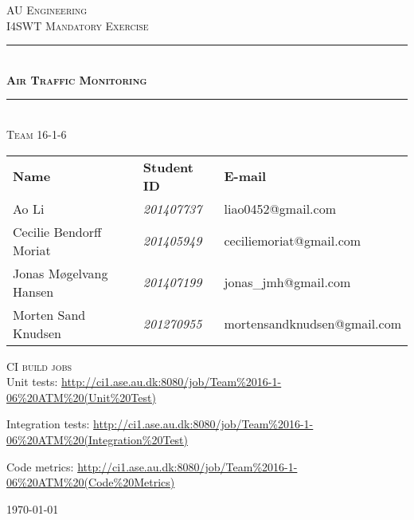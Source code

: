 \newcommand{\HRule}{\rule{\linewidth}{0.1mm}} %
\pagestyle{empty}
\begin{center}
	\vspace{3cm}
	\textsc{\LARGE AU Engineering}\\[1.5cm] %
	
	\textsc{\large I4SWT Mandatory Exercise}\\[2.5cm] 
	\HRule \\[0.8cm]
	{\huge \bfseries \textsc{Air Traffic Monitoring}} \\[0.5cm]{\LARGE }
	\HRule \\[1.5cm]
	
	\textsc{\Large Team 16-1-6}\\
	\vspace{0.5 in}
	\begin{center}
		\begin{tabular}{l l l}
			\textbf{Name} & \textbf{Student ID} & \textbf{E-mail} \\
			Ao Li & \textsl{201407737} &  liao0452@gmail.com  \\
			Cecilie Bendorff Moriat & \textsl{201405949} & ceciliemoriat@gmail.com \\
			Jonas Møgelvang Hansen & \textsl{201407199} & jonas\_jmh@gmail.com \\
			Morten Sand Knudsen & \textsl{201270955} & mortensandknudsen@gmail.com \\
			
		\end{tabular}
	\end{center}
	\vspace{1 in}
	
	\textsc{\large CI build jobs}\\
	\vspace{0.3 in}
	Unit tests:	
	\url{http://ci1.ase.au.dk:8080/job/Team%2016-1-06%20ATM%20(Unit%20Test)}

	Integration tests:
	\url{http://ci1.ase.au.dk:8080/job/Team%2016-1-06%20ATM%20(Integration%20Test)}
		
	Code metrics:
	\url{http://ci1.ase.au.dk:8080/job/Team%2016-1-06%20ATM%20(Code%20Metrics)}
	

	\vspace{0.5 in}
	
	\textsc{\large \today}\\
	\vfill %
	
\end{center} %

\clearpage

